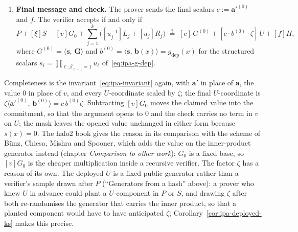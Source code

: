 \documentclass[11pt,a4paper]{article}
\theoremstyle{definition}
\newcommand{\ip}[2]{\langle #1,\, #2 \rangle}
\begin{document}
\begin{enumerate}[leftmargin=*, itemsep=2pt]
\begin{align*}
                {\mathbf b^{(j)}_{\mathrm{hi}}}]\,U ;
  \end{align*}
  the verifier accumulates $[u_j^{-1}]L_j + [u_j]R_j$, and the prover's
  blinder accumulates $f := r + \xi r_s + \sum_j (u_j^{-1}\ell_j
  + u_j\rho_j)$.
\item \textbf{Final message and check.} The prover sends the final
  scalars $c := \mathbf a'^{(0)}$ and $f$. The verifier accepts if and
  only if
  \begin{equation}\label{eq:ipa-dep-final}
  P + [\xi]S - [v]G_0 + \sum_{j=1}^{k}\bigl([u_j^{-1}]L_j + [u_j]R_j\bigr)
  \;\overset{?}{=}\;
  [c]\,G^{(0)} + [c \cdot b^{(0)} \cdot \zeta]\,U + [f]H ,
  \end{equation}
  where $G^{(0)} = \ip{\mathbf s}{\mathbf G}$ and $b^{(0)} =
  \ip{\mathbf s}{\mathbf b(x)} = g_{\mathrm{dep}}(x)$ for the structured
  scalars $s_i = \prod_{\ell : \beta_{\ell-1} = 1} u_\ell$
  of~\eqref{eq:ipa-g-dep}.
\end{enumerate}
Completeness is the invariant~\eqref{eq:ipa-invariant} again, with
$\mathbf a'$ in place of $\mathbf a$, the value $0$ in place of $v$, and
every $U$-coordinate scaled by $\zeta$; the final $U$-coordinate is
$\zeta\ip{\mathbf a'^{(0)}}{\mathbf b^{(0)}} = c\,b^{(0)}\zeta$.
Subtracting $[v]G_0$ moves the claimed value into the commitment, so
that the argument opens to $0$ and the check carries no term in $v$ on
$U$; the mask leaves the opened value unchanged in either form because
$s(x) = 0$. The halo2 book gives the reason in its comparison with the
scheme of B\"unz, Chiesa, Mishra and Spooner, which adds the value on
the inner-product generator instead (chapter \emph{Comparison to other
work}): $G_0$ is a fixed base, so $[v]G_0$ is the cheaper multiplication
inside a recursive verifier. The factor $\zeta$ has a reason of its own.
The deployed $U$ is a fixed public generator rather than a verifier's
sample drawn after $P$ (``Generators from a hash'' above): a prover who
knew $U$ in advance could plant a $U$-component in $P$ or $S$, and
drawing $\zeta$ after both re-randomises the generator that carries the
inner product, so that a planted component would have to have
anticipated $\zeta$; Corollary~\ref{cor:ipa-deployed-ks} makes this
precise.
\end{document}
